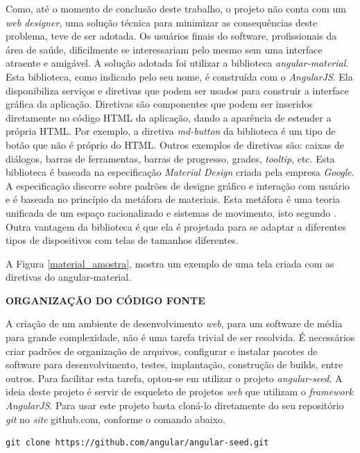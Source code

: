 Como, até o momento de conclusão deste trabalho, o projeto não conta com um \emph{web designer}, uma solução técnica para minimizar as consequências deste problema, teve de ser adotada. Os usuários finais do software, profissionais da área de saúde, dificilmente se interessariam pelo mesmo sem uma interface atraente e amigável.
A solução adotada foi utilizar a biblioteca \emph{angular-material}. 
Esta biblioteca, como indicado pelo seu nome, é construída com o \emph{AngularJS}. 
Ela disponibiliza serviços e diretivas que podem ser usados para construir a interface gráfica da aplicação. 
Diretivas são componentes que podem ser inseridos diretamente no código HTML da aplicação, dando a aparência de estender a própria HTML. 
Por exemplo, a diretiva \emph{md-button} da biblioteca é um tipo de botão que não é próprio do HTML. 
Outros exemplos de diretivas são: caixas de diálogos, barras de ferramentas, barras de progresso, grades, \emph{tooltip}, etc. 
Esta biblioteca é baseada na especificação \emph{Material Design} criada pela empresa \emph{Google}. 
A especificação discorre sobre padrões de designe gráfico e interação com usuário e é baseada no princípio da metáfora de materiais. 
Esta metáfora é uma teoria unificada de um espaço racionalizado e sistemas de movimento, isto segundo \cite{Google2015a}. Outra vantagem da biblioteca é que ela é projetada para se adaptar a diferentes tipos de dispositivos com telas de tamanhos diferentes.

A Figura \ref{material_amostra}, mostra um exemplo de uma tela criada com as diretivas do angular-material.

\textbf{ORGANIZAÇÃO DO CÓDIGO FONTE}

A criação de um ambiente de desenvolvimento \emph{web}, para um software de média para grande complexidade, não é uma tarefa trivial de ser resolvida.
É necessários criar padrões de organização de arquivos, configurar e instalar pacotes de software para desenvolvimento, testes, implantação, construção de builds, entre outros.
Para facilitar esta tarefa, optou-se em utilizar o projeto \emph{angular-seed}.
A ideia deste projeto é servir de esqueleto de projetos \emph{web} que utilizam o \emph{framework} \emph{AngularJS}.
Para usar este projeto basta cloná-lo diretamente do seu repositório \emph{git} no \emph{site} github.com, conforme o comando abaixo.
\lstset{language=bash}
\begin{lstlisting}[frame=single]
git clone https://github.com/angular/angular-seed.git
\end{lstlisting}

